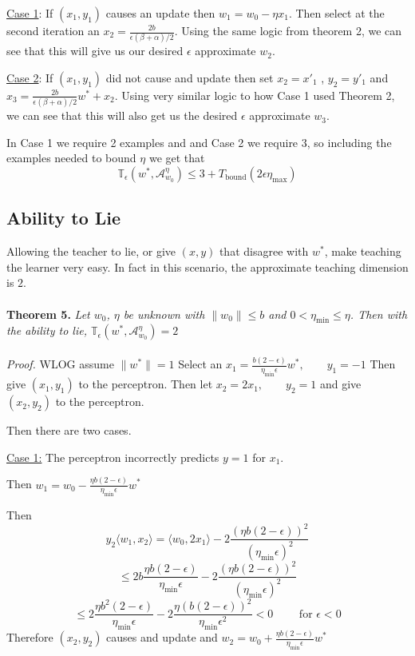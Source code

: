 \documentclass{article}
\newcommand{\learn}{\mathcal{A}_{w_0}^\eta}
\begin{document}
\underline{Case 1}: If $(x_1, y_1)$ causes an update then $w_1 = w_0 - \eta x_1$. 
Then select at the second iteration an $x_2 = \frac{2b}{\epsilon (\beta + \alpha)/2}$. Using the same logic from theorem 2, we can see that this will give us our desired $\epsilon$ approximate $w_2$. 

\underline{Case 2}: If $(x_1, y_1)$ did not cause and update then set $x_2 = x'_1$ , $y_2 = y'_1$ and $x_3 = \frac{2b}{\epsilon (\beta + \alpha)/2}w^* + x_2$. Using very similar logic to how Case 1 used Theorem 2, we can see that this will also get us the desired $\epsilon$ approximate $w_3$.

In Case 1 we require 2 examples and and Case 2 we require 3, so including the examples needed to bound $\eta$ we get that 
$$
\mathbb{T}_\epsilon(w^*, \learn) \leq 3 + T_{\text{bound}}(2\epsilon \eta_{\max})
$$

\subsection{Ability to Lie}
Allowing the teacher to lie, or give $(x,y)$ that disagree with $w^*$, make teaching the learner very easy. In fact in this scenario, the approximate teaching dimension is $2$.
\\
\\
\textbf{Theorem 5.} \textit{
Let $w_0$, $\eta$ be unknown with $\lVert w_0 \rVert \leq b$ and $0 < \eta_{\min} \leq \eta$.
Then with the ability to lie, $\mathbb{T}_{\epsilon}(w^*, \learn) = 2$
}
\\
\\
\textit{Proof.}
WLOG assume $\lVert w^* \rVert = 1$
Select an $x_1 = \frac{b(2-\epsilon)}{\eta_{\min} \epsilon}w^*, \qquad y_1 = -1$
Then give $(x_1 , y _1)$ to the perceptron.
Then let $x_2 = 2x_1, \qquad y_2 = 1$ and give $(x_2, y_2)$ to the perceptron.

Then there are two cases.

\underline{Case 1:} The perceptron incorrectly predicts $y = 1$ for $x_1$.

Then 
$
w_1 = w_0 - \frac{\eta b(2-\epsilon)}{\eta_{\min} \epsilon}w^*
$

Then 
$$y_2 \langle w_1, x_2 \rangle
 = \langle w_0, 2x_1 \rangle - 2\frac{(\eta b(2-\epsilon))^2}{(\eta_{\min}\epsilon)^2}
$$
$$
 \leq 2b\frac{\eta b(2-\epsilon)}{\eta_{\min}\epsilon}
-  2\frac{(\eta b(2-\epsilon))^2}{(\eta_{\min}\epsilon)^2} 
$$
$$
\leq 2\frac{\eta b^2(2-\epsilon)}{\eta_{\min}\epsilon}
-  2\frac{\eta (b(2-\epsilon))^2}{\eta_{\min}\epsilon^2}
< 0 \qquad \text{ for } \epsilon < 0
$$
Therefore $(x_2, y_2)$ causes and update and
$w_2 =  w_0 + \frac{\eta b(2-\epsilon)}{\eta_{\min} \epsilon}w^* $
\end{document}
